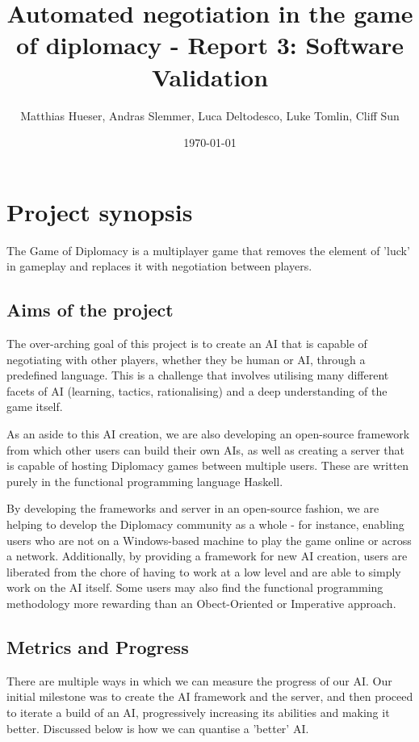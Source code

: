\documentclass[12pt]{article}
\title{Automated negotiation in the game of diplomacy - Report 3: Software Validation}
\author{Matthias Hueser, Andras Slemmer, Luca Deltodesco, Luke Tomlin, Cliff Sun}
\date{\today}
\begin{document}
\maketitle

\section{Project synopsis}
The Game of Diplomacy is a multiplayer game that removes the element of 'luck' in gameplay and replaces it with negotiation between players. 
\subsection{Aims of the project}
The over-arching goal of this project is to create an AI that is capable of negotiating with other players, whether they be human or AI, through a predefined language. This is a challenge that involves utilising many different facets of AI (learning, tactics, rationalising) and a deep understanding of the game itself.

As an aside to this AI creation, we are also developing an open-source framework from which other users can build their own AIs, as well as creating a server that is capable of hosting Diplomacy games between multiple users. These are written purely in the functional programming language Haskell.

By developing the frameworks and server in an open-source fashion, we are helping to develop the Diplomacy community as a whole - for instance, enabling users who are not on a Windows-based machine to play the game online or across a network. Additionally, by providing a framework for new AI creation, users are liberated from the chore of having to work at a low level and are able to simply work on the AI itself. Some users may also find the functional programming methodology more rewarding than an Obect-Oriented or Imperative approach.
\subsection{Metrics and Progress}
There are multiple ways in which we can measure the progress of our AI. Our initial milestone was to create the AI framework and the server, and then proceed to iterate a build of an AI, progressively increasing its abilities and making it better. Discussed below is how we can quantise a 'better' AI.
\end{document}
